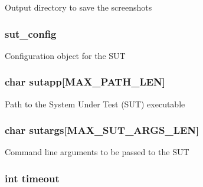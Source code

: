 Output directory to save the screenshots \hypertarget{struct_s_d_l_visual_test___harness_state_a42657080015a96da836e1640bbdf870e}{
\subsubsection[{sut\-\_\-config}]{ sut\-\_\-config}}\label{struct_s_d_l_visual_test___harness_state_a42657080015a96da836e1640bbdf870e}
Configuration object for the S\-U\-T \hypertarget{struct_s_d_l_visual_test___harness_state_af277bbb5c712eb89e92337dd583a8b74}{
\subsubsection[{sutapp}]{\setlength{\rightskip}{0pt plus 5cm}char sutapp\mbox{[}{\bf M\-A\-X\-\_\-\-P\-A\-T\-H\-\_\-\-L\-E\-N}\mbox{]}}}\label{struct_s_d_l_visual_test___harness_state_af277bbb5c712eb89e92337dd583a8b74}
Path to the System Under Test (S\-U\-T) executable \hypertarget{struct_s_d_l_visual_test___harness_state_a00fab9c7cf802b96b6b29e098292d24d}{
\subsubsection[{sutargs}]{\setlength{\rightskip}{0pt plus 5cm}char sutargs\mbox{[}{\bf M\-A\-X\-\_\-\-S\-U\-T\-\_\-\-A\-R\-G\-S\-\_\-\-L\-E\-N}\mbox{]}}}\label{struct_s_d_l_visual_test___harness_state_a00fab9c7cf802b96b6b29e098292d24d}
Command line arguments to be passed to the S\-U\-T \hypertarget{struct_s_d_l_visual_test___harness_state_a493b57f443cc38b3d3df9c1e584d9d82}{
\subsubsection[{timeout}]{\setlength{\rightskip}{0pt plus 5cm}int timeout}}\label{struct_s_d_l_visual_test___harness_state_a493b57f443cc38b3d3df9c1e584d9d82}

